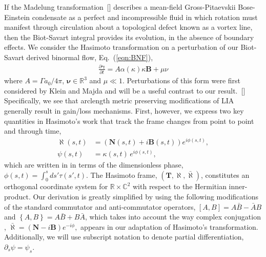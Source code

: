 \documentclass[aps,graphicx,reprint,onecolumn,12pt,tightenlines,longbibliography]{revtex4-1}
\newcommand{\sas}[2]{{#2}}
\begin{document}
If the Madelung transformation~[] describes a mean-field \sas{GP}{Gross-Pitaevskii} \sas{BEC}{Bose-Einstein condensate} as a perfect and incompressible fluid in which rotation must manifest through circulation about a topological defect known as a vortex line, then the Biot-Savart integral provides its evolution, in the absence of boundary effects. We consider the Hasimoto transformation on a perturbation of our Biot-Savart derived binormal flow, Eq.~(\ref{eqn:BNF}),
%
\begin{align}\label{eqn:Hasimoto transform1}
\frac{\partial \bm{\gamma}}{\partial t} =  A \alpha(\kappa) \kappa \textbf{B}+\mu \nu
\end{align}
%
where $A=\Gamma a_{0} / 4\pi$, $\bm{\nu}\in\mathbb{R}^{3}$ and $\mu \ll 1$. Perturbations of this form were first considered by Klein and Majda and will be a useful contrast to our result.~[] Specifically, we see that arclength metric preserving modifications of LIA generally result in gain/loss mechanisms. First, however, we express two key quantities in Hasimoto's work \sas{}{that track the frame changes from point to point and through time,}
%
\begin{align}
\label{eqn:HasNormal} \bm{\aleph}(s,t) &= ({\textbf{N}}(s,t) + i {\textbf{B}}(s,t))e^{i\phi(s,t)},\\
\label{eqn:HasWave} \psi(s,t) &= \kappa(s,t)\,  e^{i \phi(s,t)},
\end{align}
%
\sas{}{which are written in} in terms of the dimensionless phase, $\phi(s,t) = \int_{0}^{s} ds' \tau(s',t)$. The Hasimoto frame, $({\textbf{T}},\bm{\aleph}, \bar{\bm{\aleph}})$, constitutes an orthogonal coordinate system for $\mathbb{R}\times\mathbb{C}^{2}$ with respect to the Hermitian inner-product. Our derivation is greatly simplified by using the following modifications of the standard commutator and anti-commutator operators, $\left[A,B\right]= A\bar{B}-\bar{A}B$ and $\left\{A,B\right\}= A\bar{B}+B\bar{A}$, which takes into account the way complex conjugation \sas{}{, $\bar{\bm{\aleph}}=({\textbf{N}} - i {\textbf{B}})e^{-i\phi},$} appears in our adaptation of Hasimoto's transformation. \sas{}{Additionally, we will use subscript notation to denote partial differentiation, $\partial_{s} \psi = \psi_{s}$.}
\end{document}
